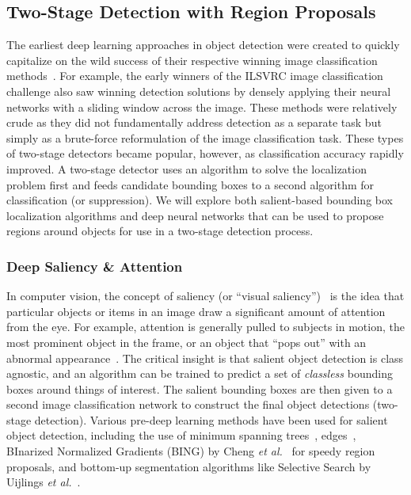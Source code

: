\subsection{Two-Stage Detection with Region Proposals}

The earliest deep learning approaches in object detection were created to quickly capitalize on the wild success of their respective winning image classification methods~\cite{krizhevsky_imagenet_2012,sermanet_overfeat:_2013,gouk_fast_2014,szegedy_deep_2013}.  For example, the early winners of the ILSVRC image classification challenge also saw winning detection solutions by densely applying their neural networks with a sliding window across the image.  These methods were relatively crude as they did not fundamentally address detection as a separate task but simply as a brute-force reformulation of the image classification task.  These types of two-stage detectors became popular, however, as classification accuracy rapidly improved.  A two-stage detector uses an algorithm to solve the localization problem first and feeds candidate bounding boxes to a second algorithm for classification (or suppression).  We will explore both salient-based bounding box localization algorithms and deep neural networks that can be used to propose regions around objects for use in a two-stage detection process.

\subsubsection{Deep Saliency \& Attention}

In computer vision, the concept of saliency (or ``visual saliency'')~\cite{chang_fusing_2011,liu_learning_2011,wang_detect_2018} is the idea that particular objects or items in an image draw a significant amount of attention from the eye. For example, attention is generally pulled to subjects in motion, the most prominent object in the frame, or an object that ``pops out'' with an abnormal appearance~\cite{wang_familiarity_1994}.  The critical insight is that salient object detection is class agnostic, and an algorithm can be trained to predict a set of \textit{classless} bounding boxes around things of interest.  The salient bounding boxes are then given to a second image classification network to construct the final object detections (two-stage detection).  Various pre-deep learning methods have been used for salient object detection, including the use of minimum spanning trees~\cite{tu_real-time_2016}, edges~\cite{zitnick_edge_2014}, BInarized Normalized Gradients (BING) by Cheng \textit{et al.}~\cite{cheng_bing:_2014} for speedy region proposals, and bottom-up segmentation algorithms like Selective Search by Uijlings \textit{et al.}~\cite{uijlings_selective_2013}.

